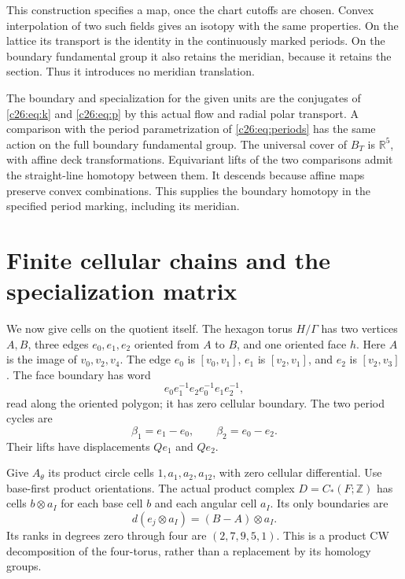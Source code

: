 This construction specifies a map, once the chart cutoffs are chosen.
Convex interpolation of two such fields gives an isotopy with the same
properties. On the lattice its transport is the identity in the
continuously marked periods. On the boundary fundamental group it also
retains the meridian, because it retains the section.
Thus it introduces no meridian translation.

The boundary and specialization for the given units are the conjugates
of \eqref{c26:eq:k} and \eqref{c26:eq:p} by this actual flow and radial
polar transport. A comparison with the period parametrization of
\eqref{c26:eq:periods} has the same action on the full boundary fundamental
group. The universal cover of $B_T$ is $\mathbb R^5$, with affine deck
transformations. Equivariant lifts of the two comparisons admit the
straight-line homotopy between them. It descends because affine maps
preserve convex combinations. This supplies the boundary homotopy in
the specified period marking, including its meridian.

\section{Finite cellular chains and the specialization matrix}

We now give cells on the quotient itself.
The hexagon torus $H/\Gamma$ has two vertices $A,B$, three edges
$e_0,e_1,e_2$ oriented from $A$ to $B$, and one oriented face $h$.
Here $A$ is the image of $v_0,v_2,v_4$.
The edge $e_0$ is $[v_0,v_1]$, $e_1$ is $[v_2,v_1]$, and
$e_2$ is $[v_2,v_3]$.
The face boundary has word
\[
e_0e_1^{-1}e_2e_0^{-1}e_1e_2^{-1},
\]
read along the oriented polygon; it has zero cellular boundary.
The two period cycles are
\begin{equation}\label{c26:eq:beta-cells}
\beta_1=e_1-e_0,\qquad \beta_2=e_0-e_2.
\end{equation}
Their lifts have displacements $Qe_1$ and $Qe_2$.

Give $A_\theta$ its product circle cells
$1,a_1,a_2,a_{12}$, with zero cellular differential.
Use base-first product orientations.
The actual product complex $D=C_*(F;\mathbb Z)$ has cells
$b\otimes a_I$ for each base cell $b$ and each angular cell $a_I$.
Its only boundaries are
\begin{equation}\label{c26:eq:dD}
d(e_j\otimes a_I)=(B-A)\otimes a_I.
\end{equation}
Its ranks in degrees zero through four are $(2,7,9,5,1)$.
This is a product CW decomposition of the four-torus, rather than a
replacement by its homology groups.

